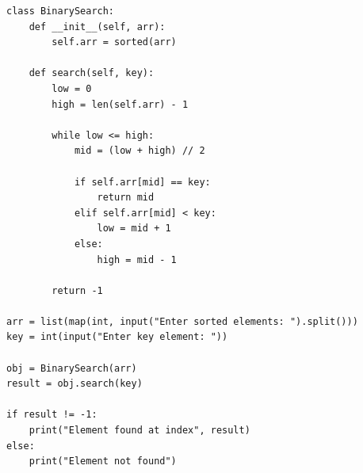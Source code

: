 \begin{verbatim}
class BinarySearch:
    def __init__(self, arr):
        self.arr = sorted(arr)

    def search(self, key):
        low = 0
        high = len(self.arr) - 1

        while low <= high:
            mid = (low + high) // 2

            if self.arr[mid] == key:
                return mid
            elif self.arr[mid] < key:
                low = mid + 1
            else:
                high = mid - 1

        return -1

arr = list(map(int, input("Enter sorted elements: ").split()))
key = int(input("Enter key element: "))

obj = BinarySearch(arr)
result = obj.search(key)

if result != -1:
    print("Element found at index", result)
else:
    print("Element not found")
\end{verbatim}